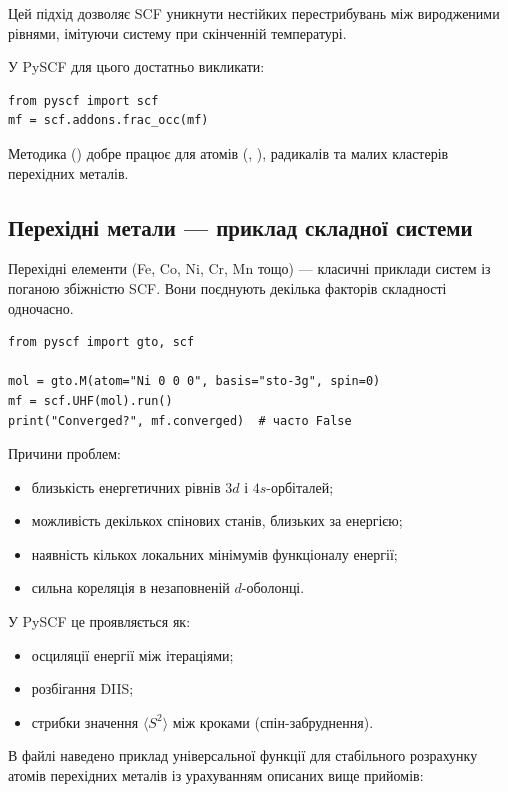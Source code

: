 Цей підхід дозволяє SCF уникнути нестійких перестрибувань між виродженими рівнями, імітуючи систему при скінченній температурі.

У PySCF для цього достатньо викликати:
\begin{verbatim}
from pyscf import scf
mf = scf.addons.frac_occ(mf)
\end{verbatim}

Методика () добре працює для атомів (, ), радикалів та малих кластерів перехідних металів.

\subsection{Перехідні метали --- приклад складної системи}

Перехідні елементи (Fe, Co, Ni, Cr, Mn тощо) --- класичні приклади систем із поганою збіжністю SCF. Вони поєднують декілька факторів складності одночасно.

\begin{verbatim}
from pyscf import gto, scf

mol = gto.M(atom="Ni 0 0 0", basis="sto-3g", spin=0)
mf = scf.UHF(mol).run()
print("Converged?", mf.converged)  # часто False
\end{verbatim}

Причини проблем:
\begin{itemize}
  \item близькість енергетичних рівнів $3d$ і $4s$-орбіталей;
  \item можливість декількох спінових станів, близьких за енергією;
  \item наявність кількох локальних мінімумів функціоналу енергії;
  \item сильна кореляція в незаповненій $d$-оболонці.
\end{itemize}

У PySCF це проявляється як:
\begin{itemize}
  \item осциляції енергії між ітераціями;
  \item розбігання DIIS;
  \item стрибки значення $\langle S^2 \rangle$ між кроками (спін-забруднення).
\end{itemize}

В файлі  наведено приклад універсальної функції для стабільного розрахунку атомів перехідних металів із урахуванням описаних вище прийомів:

